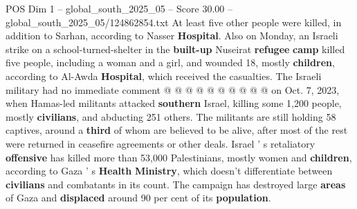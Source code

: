 \begin{textsample}{POS Dim 1 – global\_south\_2025\_05 – Score 30.00 – global\_south\_2025\_05/124862854.txt}
At least five other people were killed, in addition to Sarhan, according to Nasser \textbf{Hospital}.
Also on Monday, an Israeli strike on a school-turned-shelter in the \textbf{built-up} Nuseirat \textbf{refugee} \textbf{camp} killed five people, including a woman and a girl, and wounded 18, mostly \textbf{children}, according to Al-Awda \textbf{Hospital}, which received the casualties.
The Israeli military had no immediate comment @ @ @ @ @ @ @ @ @ @ on Oct. 7, 2023, when Hamas-led militants attacked \textbf{southern} Israel, killing some 1,200 people, mostly \textbf{civilians}, and abducting 251 others.
The militants are still holding 58 captives, around a \textbf{third} of whom are believed to be alive, after most of the rest were returned in ceasefire agreements or other deals.
Israel ' s retaliatory \textbf{offensive} has killed more than 53,000 Palestinians, mostly women and \textbf{children}, according to Gaza ' s \textbf{Health} \textbf{Ministry}, which doesn't differentiate between \textbf{civilians} and combatants in its count.
The campaign has destroyed large \textbf{areas} of Gaza and \textbf{displaced} around 90 per cent of its \textbf{population}.

\end{textsample}
